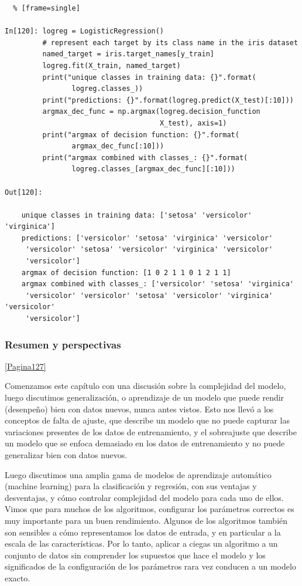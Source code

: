 {\begin{lstlisting}  % [frame=single]	

In[120]: logreg = LogisticRegression()
         # represent each target by its class name in the iris dataset
         named_target = iris.target_names[y_train]
         logreg.fit(X_train, named_target)
         print("unique classes in training data: {}".format(
                logreg.classes_))
         print("predictions: {}".format(logreg.predict(X_test)[:10]))
         argmax_dec_func = np.argmax(logreg.decision_function
                                     X_test), axis=1)
         print("argmax of decision function: {}".format(
                argmax_dec_func[:10]))
         print("argmax combined with classes_: {}".format(
                logreg.classes_[argmax_dec_func][:10]))
   
Out[120]:

    unique classes in training data: ['setosa' 'versicolor' 'virginica']
    predictions: ['versicolor' 'setosa' 'virginica' 'versicolor' 
     'versicolor' 'setosa' 'versicolor' 'virginica' 'versicolor'
     'versicolor']
    argmax of decision function: [1 0 2 1 1 0 1 2 1 1]
    argmax combined with classes_: ['versicolor' 'setosa' 'virginica' 
     'versicolor' 'versicolor' 'setosa' 'versicolor' 'virginica' 'versicolor'
     'versicolor']

\end{lstlisting} 



\subsubsection{Resumen y perspectivas}\ref{Pagina127} 

Comenzamos este capítulo con una discusión sobre la complejidad del modelo, luego discutimos 
generalización, o aprendizaje de un modelo que puede rendir (desenpeño) bien con datos nuevos, nunca antes vistos. Esto nos llevó a los conceptos de falta de ajuste, que describe un modelo que no puede
capturar las variaciones presentes de los datos de entrenamiento,  y el sobreajuste que describe un
modelo que se enfoca demasiado en los datos de entrenamiento y no puede generalizar bien con datos nuevos.

Luego discutimos una amplia gama de modelos de aprendizaje automático (machine learning) para la clasificación y regresión, con sus ventajas y desventajas, y cómo controlar 
complejidad  del modelo para cada uno de ellos.  Vimos que para muchos de los algoritmos, configurar los  parámetros correctos  es muy importante para un buen rendimiento.   Algunos de los algoritmos también son sensibles a cómo representamos los datos de entrada, y en particular a la escala de las características. Por lo tanto, aplicar a ciegas  un algoritmo a un conjunto de datos sin comprender los supuestos que hace el modelo y los significados de la configuración de los parámetros rara vez conducen a un modelo exacto.\\


}
